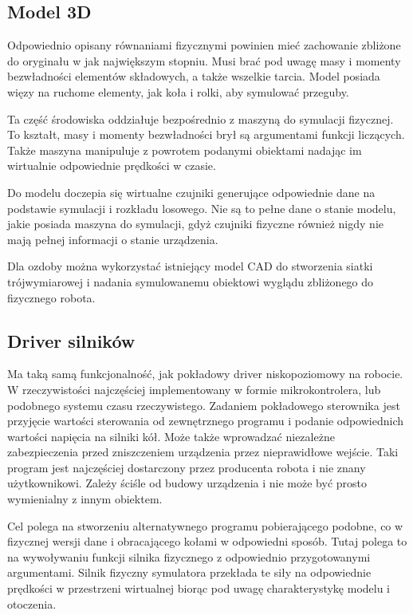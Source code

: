 \subsection{Model 3D}
 Odpowiednio opisany równaniami fizycznymi powinien mieć zachowanie zbliżone do oryginału w jak największym stopniu.
 Musi brać pod uwagę masy i momenty bezwładności elementów składowych, a także wszelkie tarcia.
 Model posiada więzy na ruchome elementy, jak koła i rolki, aby symulować przeguby.
 
 Ta część środowiska oddziałuje bezpośrednio z maszyną do symulacji fizycznej. 
 To kształt, masy i momenty bezwładności brył są argumentami funkcji liczących.
 Także maszyna manipuluje z powrotem podanymi obiektami nadając im wirtualnie odpowiednie prędkości w czasie.
 
 Do modelu doczepia się wirtualne czujniki generujące odpowiednie dane na podstawie symulacji i rozkładu losowego.
 Nie są to pełne dane o stanie modelu, jakie posiada maszyna do symulacji, gdyż czujniki fizyczne również nigdy nie mają pełnej informacji o stanie urządzenia.
 
 Dla ozdoby można wykorzystać istniejący model CAD do stworzenia siatki trójwymiarowej i nadania symulowanemu obiektowi wyglądu zbliżonego do fizycznego robota.

 \subsection{Driver silników}
 Ma taką samą funkcjonalność, jak pokładowy driver niskopoziomowy na robocie.
 W rzeczywistości najczęściej implementowany w formie mikrokontrolera, lub podobnego systemu czasu rzeczywistego.
 Zadaniem pokładowego sterownika jest przyjęcie wartości sterowania od zewnętrznego programu i podanie odpowiednich wartości napięcia na silniki kół.
 Może także wprowadzać niezależne zabezpieczenia przed zniszczeniem urządzenia przez nieprawidłowe wejście.
 Taki program jest najczęściej dostarczony przez producenta robota i nie znany użytkownikowi.
 Zależy ściśle od budowy urządzenia i nie może być prosto wymienialny z innym obiektem.
 
 Cel polega na stworzeniu alternatywnego programu pobierającego podobne, co w fizycznej wersji dane i obracającego kołami w odpowiedni sposób.
 Tutaj polega to na wywoływaniu funkcji silnika fizycznego z odpowiednio przygotowanymi argumentami.
 Silnik fizyczny symulatora przekłada te siły na odpowiednie prędkości w przestrzeni wirtualnej biorąc pod uwagę charakterystykę modelu i otoczenia.
 
